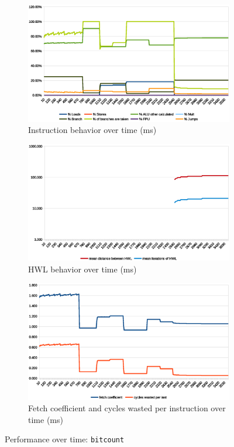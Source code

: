 \documentclass[../bachelor_paper.tex]{subfiles}
\begin{document}
\begin{figure}
    \begin{subfigure}{0.45\textwidth}
        \includegraphics[width=\textwidth]{img/graph/mibench/bitcount_inst.eps}
        \caption{Instruction behavior over time (ms)}
    \end{subfigure}
    \begin{subfigure}{0.45\textwidth}
        \includegraphics[width=\textwidth]{img/graph/mibench/bitcount_hwl.eps}
        \caption{\ac{HWL} behavior over time (ms)}
    \end{subfigure}
    \begin{subfigure}{0.45\textwidth}
        \includegraphics[width=\textwidth]{img/graph/mibench/bitcount_fetch_waste.eps}
        \caption{Fetch coefficient and cycles wasted per instruction over time (ms)}
    \end{subfigure}
    \caption{Performance over time: \texttt{bitcount}}
\end{figure}
\end{document}
